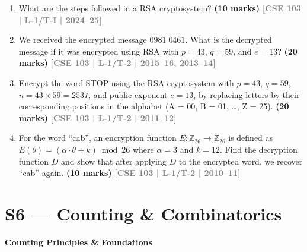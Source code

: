 \documentclass[12pt,a3paper]{article}
\newcommand{\yr}[1]{\hfill\textcolor{gray}{\small\textbf{[#1]}}}
\newcommand{\mk}[1]{\textcolor{orange!70!black}{\small\textbf{(#1 marks)}}}
\newcommand{\subtopic}[2]{%
  \vspace{10pt}
  \noindent\begin{tcolorbox}[colback=#1!8,colframe=#1,boxrule=0.6pt,arc=4pt,
    left=6pt,right=6pt,top=4pt,bottom=4pt]
    \small\bfseries\textcolor{#1}{#2}
  \end{tcolorbox}
  \vspace{2pt}
}
\begin{document}
\begin{enumerate}

\item What are the steps followed in a RSA cryptosystem?
\mk{10} \yr{CSE 103 | L-1/T-I | 2024--25}

\item We received the encrypted message $0981\;0461$. What is the decrypted message if it was encrypted using RSA with $p = 43$, $q = 59$, and $e = 13$?
\mk{20} \yr{CSE 103 | L-1/T-2 | 2015--16, 2013--14}  
  
\item Encrypt the word STOP using the RSA cryptosystem with $p = 43$, $q = 59$, $n = 43 \times 59 = 2537$, and public exponent $e = 13$, by replacing letters by their corresponding positions in the alphabet (A = 00, B = 01, \ldots, Z = 25).
\mk{20} \yr{CSE 103 | L-1/T-2 | 2011--12}

\item For the word ``cab'', an encryption function $E: \mathbb{Z}_{26} \to \mathbb{Z}_{26}$ is defined as $E(\theta) = (\alpha \cdot \theta + k) \bmod 26$ where $\alpha = 3$ and $k = 12$. Find the decryption function $D$ and show that after applying $D$ to the encrypted word, we recover ``cab'' again.
\mk{10} \yr{CSE 103 | L-1/T-2 | 2010--11}  

\end{enumerate}



\section{S6 --- Counting \& Combinatorics}
\label{sec:S6}

\subtopic{cC}{Counting Principles \& Foundations}
\label{sub:s6-counting}
\end{document}
